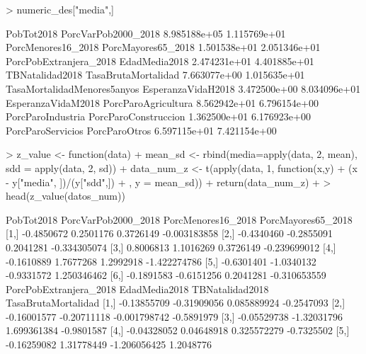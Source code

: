 \documentclass[11pt]{article}
\begin{document}
\begin{Schunk}
\begin{Sinput}
> numeric_des["media",]
\end{Sinput}
\begin{Soutput}
                 PobTot2018         PorcVarPob2000_2018 
               8.985188e+05                1.115769e+01 
         PorcMenores16_2018          PorcMayores65_2018 
               1.501538e+01                2.051346e+01 
     PorcPobExtranjera_2018               EdadMedia2018 
               2.474231e+01                4.401885e+01 
            TBNatalidad2018         TasaBrutaMortalidad 
               7.663077e+00                1.015635e+01 
TasaMortalidadMenores5anyos          EsperanzaVidaH2018 
               3.472500e+00                8.034096e+01 
         EsperanzaVidaM2018         PorcParoAgricultura 
               8.562942e+01                6.796154e+00 
          PorcParoIndustria        PorcParoConstruccion 
               1.362500e+01                6.176923e+00 
          PorcParoServicios               PorcParoOtros 
               6.597115e+01                7.421154e+00 
\end{Soutput}
\begin{Sinput}
> z_value <- function(data){
+   mean_sd <- rbind(media=apply(data, 2, mean), sdd = apply(data, 2, sd))
+   data_num_z <- t(apply(data, 1, function(x,y){
+     (x - y["media", ])/(y["sdd",])
+   }, y = mean_sd))
+   return(data_num_z)
+ }
> head(z_value(datos_num))
\end{Sinput}
\begin{Soutput}
     PobTot2018 PorcVarPob2000_2018 PorcMenores16_2018 PorcMayores65_2018
[1,] -0.4850672           0.2501176          0.3726149       -0.003183858
[2,] -0.4340460          -0.2855091          0.2041281       -0.334305074
[3,]  0.8006813           1.1016269          0.3726149       -0.239699012
[4,] -0.1610889           1.7677268          1.2992918       -1.422274786
[5,] -0.6301401          -1.0340132         -0.9331572        1.250346462
[6,] -0.1891583          -0.6151256          0.2041281       -0.310653559
     PorcPobExtranjera_2018 EdadMedia2018 TBNatalidad2018 TasaBrutaMortalidad
[1,]            -0.13855709   -0.31909056     0.085889924          -0.2547093
[2,]            -0.16001577   -0.20711118    -0.001798742          -0.5891979
[3,]            -0.05529738   -1.32031796     1.699361384          -0.9801587
[4,]            -0.04328052    0.04648918     0.325572279          -0.7325502
[5,]            -0.16259082    1.31778449    -1.206056425           1.2048776

\end{Soutput}
\end{Schunk}
\end{document}
